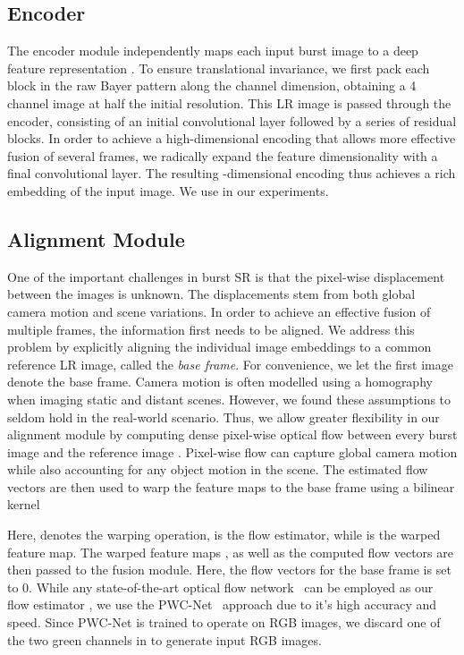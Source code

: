 \subsection{Encoder} 
The encoder module  independently maps each input burst image  to a deep feature representation . To ensure translational invariance, we first pack each  block in the raw Bayer pattern along the channel dimension, obtaining a 4 channel image  at half the initial resolution. This LR image is passed through the encoder, consisting of an initial convolutional layer followed by a series of residual blocks. In order to achieve a high-dimensional encoding that allows more effective fusion of several frames, we radically expand the feature dimensionality with a final convolutional layer. The resulting -dimensional encoding  thus achieves a rich embedding of the input image. We use  in our experiments.

\subsection{Alignment Module} 
One of the important challenges in burst SR is that the pixel-wise displacement between the images is unknown. The displacements stem from both global camera motion and scene variations. In order to achieve an effective fusion of multiple frames, the information first needs to be aligned. We address this problem by explicitly aligning the individual image embeddings  to a common reference LR image, called the \emph{base frame}. For convenience, we let the first image  denote the base frame.
Camera motion is often modelled using a homography when imaging static and distant scenes. However, we found these assumptions to seldom hold in the real-world scenario. Thus, we allow greater flexibility in our alignment module by computing dense pixel-wise optical flow  between every burst image  and the reference image . Pixel-wise flow can capture global camera motion while also accounting for any object motion in the scene. The estimated flow vectors  are then used to warp the feature maps  to the base frame using a bilinear kernel

Here,  denotes the warping operation,  is the flow estimator, while  is the warped feature map. The warped feature maps , as well as the computed flow vectors  are then passed to the fusion module. Here, the flow vectors  for the base frame is set to 0.
While any state-of-the-art optical flow network~\cite{IMKDB17,Sun2018PWCNetCF,Teed2020RAFTRA,GOCor_Truong_2020} can be employed as our flow estimator , we use the PWC-Net~\cite{Sun2018PWCNetCF} approach due to it's high accuracy and speed. 
Since PWC-Net is trained to operate on RGB images, we discard one of the two green channels in  to generate input RGB images. 

